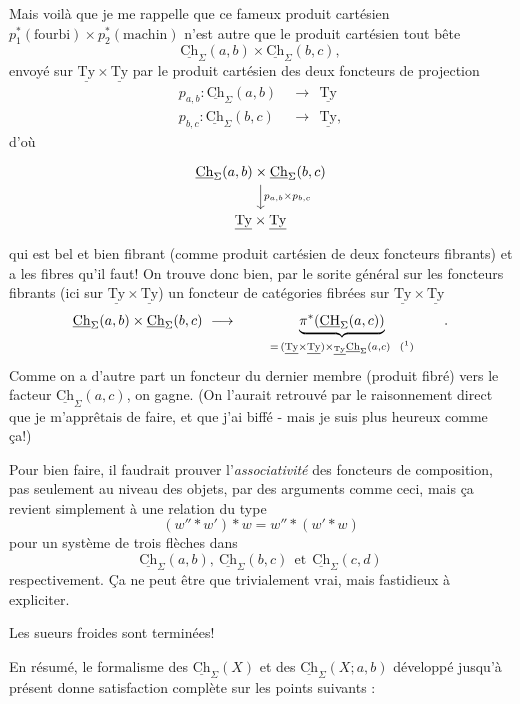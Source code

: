 \documentclass[11pt]{article}
\newcommand{\printedpage}[1]{\marginpar{\footnotesize p.~#1}}
\newcommand{\msp}[1]{\marginpar{\vspace*{10pt}\footnotesize [#1]}}
\newcommand{\Ch}{\underline{\mathrm{Ch}}}
\newcommand{\Ty}{\underline{\mathrm{Ty}}}
\newcommand{\CH}{\underline{\mathrm{CH}}}
\begin{document}
\msp{page 80}
Mais voilà que je me rappelle que ce fameux produit cartésien $p_1^*(\text{fourbi})\times p_2^*(\text{machin})$ n'est autre que le produit cartésien tout bête
\[
\Ch_{\Sigma}(a,b)\times\Ch_{\Sigma}(b,c),
\]
envoyé sur $\Ty\times\Ty$ par le produit cartésien des deux foncteurs de projection
\[
\begin{aligned}
p_{a,b} : \Ch_{\Sigma}(a,b) &\ \longrightarrow\ \ \Ty\\
p_{b,c} : \Ch_{\Sigma}(b,c) &\ \longrightarrow\ \ \Ty,
\end{aligned}
\]
d'où
\[
\begin{tikzcd}
\Ch_{\Sigma}(a,b)\times\Ch_{\Sigma}(b,c) \ar[d,"p_{a,b}\times p_{b,c}"] \\
\Ty\times\Ty
\end{tikzcd}
\]
\msp{page 81}
qui est bel et bien fibrant (comme produit cartésien de deux foncteurs fibrants) et a les fibres qu'il faut! On trouve donc bien, par le sorite général sur les foncteurs fibrants (ici sur $\Ty\times\Ty$) un foncteur de catégories fibrées sur $\Ty\times\Ty$
\[
\Ch_{\Sigma}(a,b)\times\Ch_{\Sigma}(b,c) \ \longrightarrow\ \qquad \underbrace{\pi^*(\CH_{\Sigma}(a,c))}_{=\,(\Ty\times\Ty)\times_{\Ty}\Ch_{\Sigma}(a,c)\ \ \text{(\footnotemark)}} \qquad .
\]
\footnotetext{produit fibré par $\pi : \Ty\times\Ty \longrightarrow \Ty$.}
Comme on a d'autre part un foncteur du dernier membre (produit fibré) vers le facteur $\Ch_{\Sigma}(a,c)$, on gagne. (On l'aurait retrouvé par le raisonnement direct que je m'apprêtais de faire, et que j'ai biffé - mais je suis plus heureux comme ça!)

\printedpage{53}
Pour bien faire, il faudrait prouver l'\textit{associativité} des foncteurs de composition, pas seulement au niveau des objets, par des arguments comme ceci, mais ça revient simplement à une relation du type
\[
(w''*w')*w = w''*(w'*w)
\]
pour un système de trois flèches dans
\[
\Ch_{\Sigma}(a,b),\ \Ch_{\Sigma}(b,c)\ \ \text{et}\ \ \Ch_{\Sigma}(c,d)
\]
respectivement. Ça ne peut être que trivialement
\msp{page 82}
vrai, mais fastidieux à expliciter.

Les sueurs froides sont terminées!

En résumé, le formalisme des $\Ch_{\Sigma}(X)$ et des $\Ch_{\Sigma}(X;a,b)$ développé jusqu'à présent donne satisfaction complète sur les points suivants :
\end{document}
